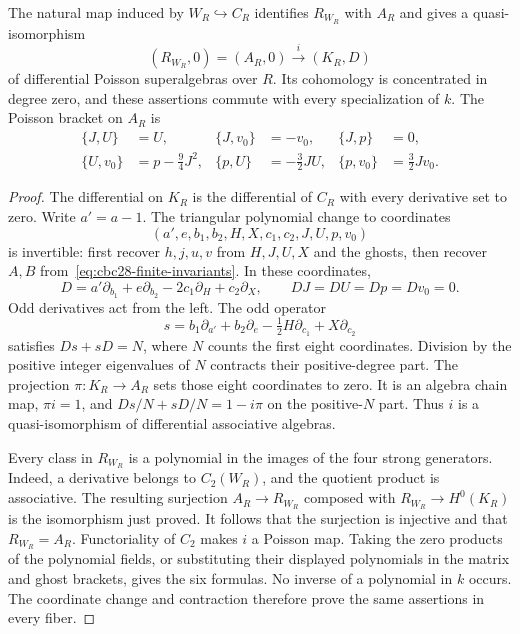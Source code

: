 \begin{theorem}\label{thm:cbc28-c2-reduction}
The natural map induced by $W_R\hookrightarrow C_R$ identifies $R_{W_R}$ with $A_R$ and gives a quasi-isomorphism
\[
 (R_{W_R},0)=(A_R,0)\xrightarrow{\ i\ }(K_R,D)
\]
of differential Poisson superalgebras over $R$.
Its cohomology is concentrated in degree zero, and these assertions commute with every specialization of $k$.
The Poisson bracket on $A_R$ is
\begin{align*}
 \{J,U\}&=U,&\{J,v_0\}&=-v_0,&\{J,p\}&=0,\\
 \{U,v_0\}&=p-\tfrac94J^2,&
 \{p,U\}&=-\tfrac32JU,&\{p,v_0\}&=\tfrac32Jv_0.
\end{align*}
\end{theorem}
\begin{proof}
The differential on $K_R$ is the differential of $C_R$ with every derivative set to zero.
Write $a'=a-1$.
The triangular polynomial change to coordinates
\[
 (a',e,b_1,b_2,H,X,c_1,c_2,J,U,p,v_0)
\]
is invertible: first recover $h,j,u,v$ from $H,J,U,X$ and the ghosts, then recover $A,B$ from~\eqref{eq:cbc28-finite-invariants}.
In these coordinates,
\[
 D=a'\partial_{b_1}+e\partial_{b_2}-2c_1\partial_H+c_2\partial_X,
 \qquad DJ=DU=Dp=Dv_0=0.
\]
Odd derivatives act from the left.
The odd operator
\[
 s=b_1\partial_{a'}+b_2\partial_e-\tfrac12H\partial_{c_1}+X\partial_{c_2}
\]
satisfies $Ds+sD=N$, where $N$ counts the first eight coordinates.
Division by the positive integer eigenvalues of $N$ contracts their positive-degree part.
The projection $\pi:K_R\to A_R$ sets those eight coordinates to zero.
It is an algebra chain map, $\pi i=1$, and $Ds/N+sD/N=1-i\pi$ on the positive-$N$ part.
Thus $i$ is a quasi-isomorphism of differential associative algebras.

Every class in $R_{W_R}$ is a polynomial in the images of the four strong generators.
Indeed, a derivative belongs to $C_2(W_R)$, and the quotient product is associative.
The resulting surjection $A_R\to R_{W_R}$ composed with
$R_{W_R}\to H^0(K_R)$ is the isomorphism just proved.
It follows that the surjection is injective and that $R_{W_R}=A_R$.
Functoriality of $C_2$ makes $i$ a Poisson map.
Taking the zero products of the polynomial fields, or substituting their displayed polynomials in the matrix and ghost brackets, gives the six formulas.
No inverse of a polynomial in $k$ occurs.
The coordinate change and contraction therefore prove the same assertions in every fiber.
\end{proof}

